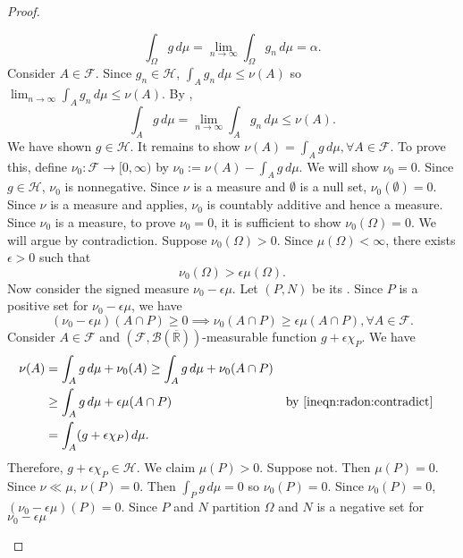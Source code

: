 \begin{proof}
\begin{step}
\begin{equation*}
    \int_{\Omega} g \,d\mu = \lim_{n \to \infty} \int_\Omega g_n \,d\mu = \alpha.
\end{equation*}
Consider $A \in \mathcal{F}$. Since $g_n \in \mathcal{H}$, $\int_A g_n \,d\mu \leq \nu(A)$ so $ \lim_{n \to \infty} \int_A g_n \,d\mu \leq \nu(A)$. 
\newpage
By ,
\begin{equation*}
    \int_{A} g \,d\mu = \lim_{n \to \infty} \int_A g_n \,d\mu \leq \nu(A).
\end{equation*}
We have shown $g \in \mathcal{H}$. It remains to show $\nu(A) = \int_{A} g \,d\mu, \forall A \in \mathcal{F}$.
To prove this, define $\nu_0 : \mathcal{F} \to [0, \infty)$ by $\nu_0 := \nu(A) - \int_{A} g \,d\mu$. We will show $\nu_0 = 0$. Since $g \in \mathcal{H}$, $\nu_0$ is nonnegative. Since $\nu$ is a measure and $\emptyset$ is a null set, $\nu_0(\emptyset) = 0$.
Since $\nu$ is a measure and  applies,  $\nu_0$ is countably additive and hence a measure. Since $\nu_0$ is a measure, to prove $\nu_0 = 0$, it is sufficient to show $\nu_0 (\Omega) = 0$. We will argue by contradiction. Suppose $\nu_0 (\Omega) > 0$. Since $\mu(\Omega) < \infty$, there exists $\epsilon > 0$ such that
\begin{equation}
    \label{eqn:radon:omega}
    \nu_0(\Omega) > \epsilon \mu (\Omega).
\end{equation}
Now consider the signed measure $\nu_0 - \epsilon \mu$. Let $(P, N)$ be its . Since $P$ is a positive set for $\nu_0 - \epsilon \mu$, we have
\begin{equation}
    \label{ineqn:radon:contradict}
    (\nu_0 - \epsilon \mu)(A \cap P) \geq 0 \implies \nu_0 (A \cap P) \geq \epsilon \mu (A \cap P), \forall A \in \mathcal{F}.
\end{equation}
Consider $A \in \mathcal{F}$ and  $(\mathcal{F}, \mathcal{B}( \overline{\mathbb{R}}))$-measurable function $g + \epsilon \chi_P$. We have
\begin{align*}
    \nu(A) &= \int_{A} g \,d\mu + \nu_0(A) \geq \int_{A} g \,d\mu + \nu_0(A \cap P)  & \\
                &\geq \int_{A} g \,d\mu + \epsilon \mu (A \cap P) & \text{by \ref{ineqn:radon:contradict}} & \\
                &= \int_{A} (g + \epsilon \chi_P) \,d\mu.
\end{align*}
Therefore, $g + \epsilon \chi_P \in \mathcal{H}$. We claim $\mu(P) > 0$. Suppose not. Then $\mu(P) = 0$. Since $\nu \ll \mu$, $\nu(P) = 0$. Then $\int_{P} g \,d\mu = 0$ so $\nu_0(P) = 0$. Since $\nu_0(P) = 0$, $(\nu_0 - \epsilon \mu) (P) = 0$. Since $P$ and $N$ partition $\Omega$ and $N$ is a negative set for $\nu_0 - \epsilon \mu$

\end{step}
\end{proof}
